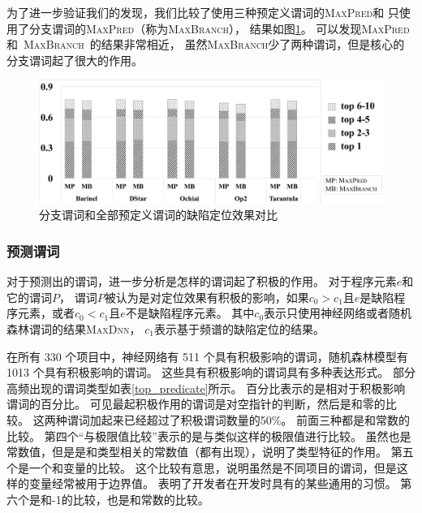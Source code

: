 
为了进一步验证我们的发现，我们比较了使用三种预定义谓词的\textsc{MaxPred}和
只使用了分支谓词的\textsc{MaxPred}（称为\textsc{MaxBranch}），
结果如图\ref{fig:branch-compare}。
可以发现\textsc{MaxPred}和~\textsc{MaxBranch}~的结果非常相近，
虽然\textsc{MaxBranch}少了两种谓词，但是核心的分支谓词起了很大的作用。

\begin{figure}[htbp] 
\centering 
\includegraphics[width=16cm]{figure/branch-compare} 
\caption{分支谓词和全部预定义谓词的缺陷定位效果对比} 
\label{fig:branch-compare}
\end{figure}

\subsubsection{预测谓词}
\label{sec:eval_pref_predict}

对于预测出的谓词，进一步分析是怎样的谓词起了积极的作用。
对于程序元素$e$和它的谓词$P$，
谓词$P$被认为是对定位效果有积极的影响，如果$c_0 > c_1$且$e$是缺陷程序元素，或者$c_0 < c_1$且$e$不是缺陷程序元素。
其中$c_0$表示只使用神经网络或者随机森林谓词的结果\textsc{MaxDnn}，
$c_1$表示基于频谱的缺陷定位的结果。

在所有 330 个项目中，神经网络有 511 个具有积极影响的谓词，随机森林模型有 1013 个具有积极影响的谓词。
这些具有积极影响的谓词具有多种表达形式。
部分高频出现的谓词类型如表\ref{top_predicate}所示。
百分比表示的是相对于积极影响谓词的百分比。
可见最起积极作用的谓词是对空指针的判断，然后是和零的比较。
这两种谓词加起来已经超过了积极谓词数量的50\%。
前面三种都是和常数的比较。
第四个“与极限值比较”表示的是与类似这样的极限值进行比较。
虽然也是常数值，但是是和类型相关的常数值（都有出现），说明了类型特征的作用。
第五个是一个和变量的比较。
这个比较有意思，说明虽然是不同项目的谓词，但是这样的变量经常被用于边界值。
表明了开发者在开发时具有的某些通用的习惯。
第六个是和-1的比较，也是和常数的比较。


